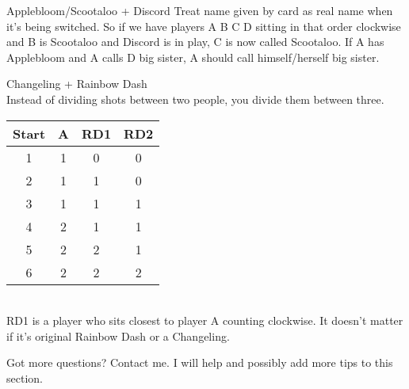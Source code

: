 \documentclass[notitlepage]{article}
\begin{document}
Applebloom/Scootaloo + Discord\newline
Treat name given by card as real name when it's being switched. So if we have players A B C D sitting in that order clockwise and B is Scootaloo and Discord is in play, C is now called Scootaloo. If A has Applebloom and A calls D big sister, A should call himself/herself big sister.

Changeling + Rainbow Dash\\
Instead of dividing shots between two people, you divide them between three.
\begin{tabular}{| c | c | c | c |}
\hline
Start & A & RD1 & RD2 \\ \hline
1 & 1 & 0 & 0 \\ \hline
2 & 1 & 1 & 0 \\ \hline
3 & 1 & 1 & 1 \\ \hline
4 & 2 & 1 & 1 \\ \hline
5 & 2 & 2 & 1 \\ \hline
6 & 2 & 2 & 2 \\ \hline
\end{tabular}\\
RD1 is a player who sits closest to player A counting clockwise. It doesn't matter if it's original Rainbow Dash or a Changeling.

Got more questions? Contact me. I will help and possibly add more tips to this section.
\end{document}
